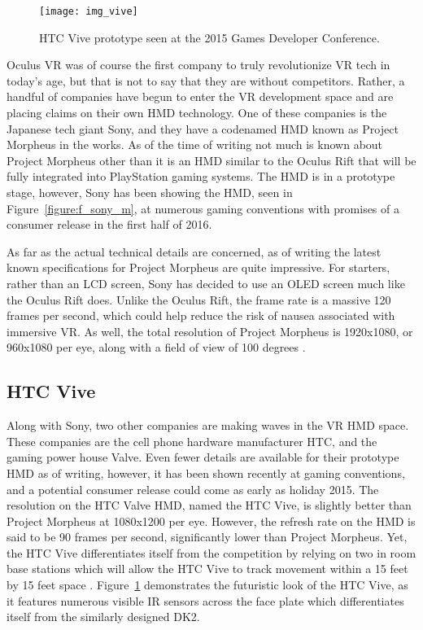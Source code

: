 \begin{figure}
  \centering
  \texttt{[image: img\_vive]}
  \caption{HTC Vive prototype seen at the 2015 Games Developer Conference.}
  \label{figure:f_vive}
\end{figure}

Oculus VR was of course the first company to truly revolutionize VR tech in today's age, but that is not to say that they are without competitors. Rather, a handful of companies have begun to enter the VR development space and are placing claims on their own HMD technology. One of these companies is the Japanese tech giant Sony, and they have a codenamed HMD known as Project Morpheus in the works. As of the time of writing not much is known about Project Morpheus other than it is an HMD similar to the Oculus Rift that will be fully integrated into PlayStation gaming systems. The HMD is in a prototype stage, however, Sony has been showing the HMD, seen in Figure~\ref{figure:f_sony_m}, at numerous gaming conventions with promises of a consumer release in the first half of 2016.

As far as the actual technical details are concerned, as of writing the latest known specifications for Project Morpheus are quite impressive. For starters, rather than an LCD screen, Sony has decided to use an OLED screen much like the Oculus Rift does. Unlike the Oculus Rift, the frame rate is a massive 120 frames per second, which could help reduce the risk of nausea associated with immersive VR. As well, the total resolution of Project Morpheus is 1920x1080, or 960x1080 per eye, along with a field of view of 100 degrees \cite{kelion_sonys_2015}. 

\subsection{HTC Vive}
\label{sec:valvevr}

Along with Sony, two other companies are making waves in the VR HMD space. These companies are the cell phone hardware manufacturer HTC, and the gaming power house Valve. Even fewer details are available for their prototype HMD as of writing, however, it has been shown recently at gaming conventions, and a potential consumer release could come as early as holiday 2015. The resolution on the HTC Valve HMD, named the HTC Vive, is slightly better than Project Morpheus at 1080x1200 per eye. However, the refresh rate on the HMD is said to be 90 frames per second, significantly lower than Project Morpheus. Yet, the HTC Vive differentiates itself from the competition by relying on two in room base stations which will allow the HTC Vive to track movement within a 15 feet by 15 feet space \cite{kelion_htc_2015}. Figure~\ref{figure:f_vive} demonstrates the futuristic look of the HTC Vive, as it features numerous visible IR sensors across the face plate which differentiates itself from the similarly designed DK2.